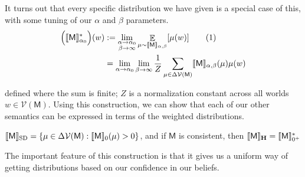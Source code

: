 \documentclass{article}
\newcommand\numberthis{\addtocounter{equation}{1}\tag{\theequation}}
\newcommand\SD{_{\text{SD}}}
\newcommand\MaxEnt{_{\mathbf H}}
\newcommand{\V}{\mathcal V}
\newcommand{\sfM}{\mathsf M}
\numberwithin{equation}{section}
\begin{document}
\begin{notfocus}
	It turns out that every specific distribution we have given is a special case of this, with some tuning of our $\alpha$ and $\beta$ parameters. 
	\begin{align*}
		\Big(\bbr{\sfM}_{\alpha_0}^*\Big)(w) &:= \lim_{\substack{\alpha \to \alpha_0 \\ \beta \to \infty}} 
		\E_{\mu \sim \bbr{\sfM}_{\alpha,\beta}} [\mu(w)] \numberthis\label{eqn:higher-expectation} \\
		&= \lim_{\alpha \to \alpha_0 } \lim_{\beta \to \infty}  \frac{1}{Z} \sum_{\mu \in \Delta\V(\sfM)} \bbr{\sfM}_{\alpha,\beta}(\mu) \mu(w) 
	\end{align*}
	
	defined where the sum is finite; $Z$ is a normalization constant across all worlds $w \in \V(\sfM)$. 
	Using this construction, we can show that each of our other semantics can be expressed in terms of the weighted distributions.
	
	\begin{prop}
		$\bbr{\sfM}\SD = \{ \mu \in \Delta \V(\sfM) : \bbr{\sfM}_0 (\mu) > 0 \}$, 
		and if $\sfM$ is consistent, then $\bbr{\sfM}\MaxEnt = \bbr{\sfM}_{0^+}^*$
	\end{prop}
	
	The important feature of this construction is that it gives us a uniform way of getting distributions based on our confidence in our beliefs.

	
	
	\begin{vfull}

\end{vfull}
\end{notfocus}
\end{document}
